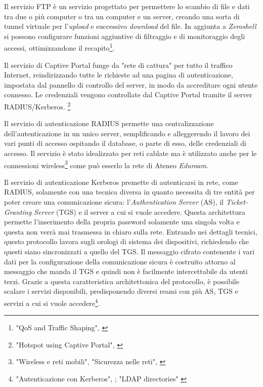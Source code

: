                 Il servizio FTP è un servizio progettato per permettere lo scambio di file e dati tra due o più computer o tra un computer e un server, creando una sorta di tunnel virtuale per l'\textit{upload} e successivo \textit{download} del file. In aggiunta a \textit{Zeroshell} si possono configurare funzioni aggiuntive di filtraggio e di monitoraggio degli accessi, ottimizzandone il recapito\footnote{"QoS and Traffic Shaping", \cite{ZeroshellLinuxRouter2021}}.
            \par
                Il servizio di Captive Portal funge da "rete di cattura" per tutto il traffico Internet, reindirizzando tutte le richieste ad una pagina di autenticazione, impostata dal pannello di controllo del server, in modo da accreditare ogni utente connesso. Le credenziali vengono controllate dal Captive Portal tramite il server RADIUS/Kerberos.
                \footnote{"Hotspot using Captive Portal", \cite{ZeroshellLinuxRouter2021}}
            \par
                Il servizio di autenticazione RADIUS permette una centralizzazione dell'autenticazione in un unico server, semplificando e alleggerendo il lavoro dei vari punti di accesso ospitando il database, o parte di esso, delle credenziali di accesso. Il servizio è stato idealizzato per reti cablate ma è utilizzato anche per le connessioni wireless\footnote{"Wireless e reti mobili", "Sicurezza nelle reti", \cite{kuroseRetiDiCalcolatori2022}} come può esserlo la rete di Ateneo \textit{Eduroam}.
            \par
                Il servizio di autenticazione Kerberos premette di autenticarsi in rete, come RADIUS, solamente con una tecnica diversa in quanto necessita di tre entità per poter creare una comunicazione sicura: l'\textit{Authentication Server} (AS), il \textit{Ticket-Granting Server} (TGS) e il server a cui si vuole accedere. Questa architettura permette l'inserimento della propria password solamente una singola volta e questa non verrà mai trasmessa in chiaro sulla rete. Entrando nei dettagli tecnici, questo protocollo lavora sugli orologi di sistema dei dispositivi, richiedendo che questi siano sincronizzati a quello del TGS. Il messaggio cifrato contenente i vari dati per la configurazione della comunicazione sicura è costruito attorno al messaggio che manda il TGS e quindi non è facilmente intercettabile da utenti terzi. Grazie a questa caratteristica architettonica del protocollo, è possibile scalare i servizi disponibili, predisponendo diversi reami con più AS, TGS e servizi a cui si vuole accedere\footnote{"Autenticazione con Kerberos", \cite{tanenbaumRetiDiCalcolatori2011}; "LDAP directories" \cite{ZeroshellLinuxRouter2021}}. 
